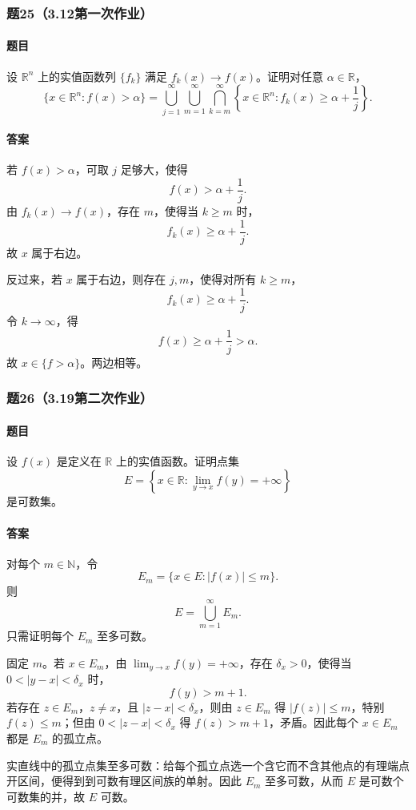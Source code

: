 \documentclass{article}
\newcommand{\R}{\mathbb{R}}
\newcommand{\N}{\mathbb{N}}
\begin{document}
\subsubsection*{题25（3.12第一次作业）}
\paragraph{题目}设 $\R^n$ 上的实值函数列 $\{f_k\}$ 满足 $f_k(x)\to f(x)$。证明对任意 $\alpha\in\R$，
\[
\{x\in\R^n:f(x)>\alpha\}
=
\bigcup_{j=1}^{\infty}\bigcup_{m=1}^{\infty}
\bigcap_{k=m}^{\infty}
\left\{x\in\R^n:f_k(x)\ge \alpha+\frac1j\right\}.
\]

\paragraph{答案}若 $f(x)>\alpha$，可取 $j$ 足够大，使得
\[
f(x)>\alpha+\frac1j.
\]
由 $f_k(x)\to f(x)$，存在 $m$，使得当 $k\ge m$ 时，
\[
f_k(x)\ge\alpha+\frac1j.
\]
故 $x$ 属于右边。

反过来，若 $x$ 属于右边，则存在 $j,m$，使得对所有 $k\ge m$，
\[
f_k(x)\ge\alpha+\frac1j.
\]
令 $k\to\infty$，得
\[
f(x)\ge\alpha+\frac1j>\alpha.
\]
故 $x\in\{f>\alpha\}$。两边相等。

\subsubsection*{题26（3.19第二次作业）}
\paragraph{题目}设 $f(x)$ 是定义在 $\R$ 上的实值函数。证明点集
\[
E=\left\{x\in\R:\lim_{y\to x}f(y)=+\infty\right\}
\]
是可数集。

\paragraph{答案}对每个 $m\in\N$，令
\[
E_m=\{x\in E: |f(x)|\le m\}.
\]
则
\[
E=\bigcup_{m=1}^{\infty}E_m.
\]
只需证明每个 $E_m$ 至多可数。

固定 $m$。若 $x\in E_m$，由 $\lim_{y\to x}f(y)=+\infty$，存在 $\delta_x>0$，使得当 $0<|y-x|<\delta_x$ 时，
\[
f(y)>m+1.
\]
若存在 $z\in E_m$，$z\ne x$，且 $|z-x|<\delta_x$，则由 $z\in E_m$ 得 $|f(z)|\le m$，特别 $f(z)\le m$；但由 $0<|z-x|<\delta_x$ 得 $f(z)>m+1$，矛盾。因此每个 $x\in E_m$ 都是 $E_m$ 的孤立点。

实直线中的孤立点集至多可数：给每个孤立点选一个含它而不含其他点的有理端点开区间，便得到到可数有理区间族的单射。因此 $E_m$ 至多可数，从而 $E$ 是可数个可数集的并，故 $E$ 可数。
\end{document}
